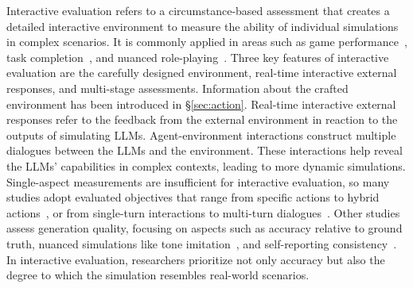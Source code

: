 Interactive evaluation refers to a circumstance-based assessment that creates a detailed interactive environment to measure the ability of individual simulations in complex scenarios. It is commonly applied in areas such as game performance~\cite{chalamalasetti2023clembenchusinggameplay,light2023avalonbenchevaluatingllmsplaying}, task completion~\cite{chen2023chatcottoolaugmentedchainofthoughtreasoning,wang2023chatcoderchatbasedrefinerequirement,farn2023tooltalkevaluatingtoolusageconversational}, and nuanced role-playing~\cite{chawla2023selfishwiselyinvestigatingimpact,jandaghi2023faithfulpersonabasedconversationaldataset}. Three key features of interactive evaluation are the carefully designed environment, real-time interactive external responses, and multi-stage assessments. Information about the crafted environment has been introduced in \S\ref{sec:action}. Real-time interactive external responses refer to the feedback from the external environment in reaction to the outputs of simulating LLMs. Agent-environment interactions construct multiple dialogues between the LLMs and the environment. These interactions help reveal the LLMs' capabilities in complex contexts, leading to more dynamic simulations. Single-aspect measurements are insufficient for interactive evaluation, so many studies adopt evaluated objectives that range from specific actions to hybrid actions~\cite{wang2024surveyagentconversationalpersonalizedefficient}, or from single-turn interactions to multi-turn dialogues~\cite{shao2023characterllmtrainableagentroleplaying}. Other studies assess generation quality, focusing on aspects such as accuracy relative to ground truth, nuanced simulations like tone imitation~\cite{wang2024rolellmbenchmarkingelicitingenhancing,huang2024embodiedgeneralistagent3d}, and self-reporting consistency~\cite{liu2023agentbenchevaluatingllmsagents}. In interactive evaluation, researchers prioritize not only accuracy but also the degree to which the simulation resembles real-world scenarios.

